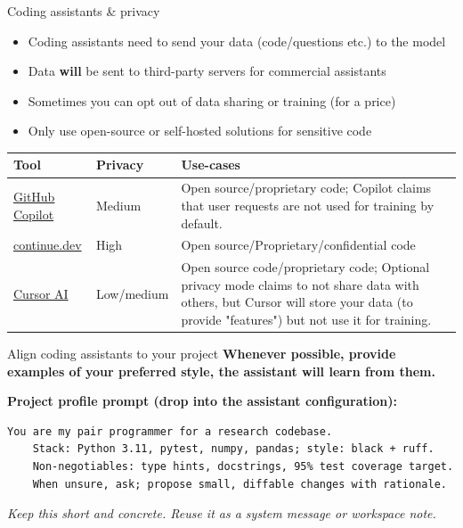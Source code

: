 \documentclass[
  aspectratio=1610,
]{beamer}
\begin{document}
\begin{frame}{Coding assistants \& privacy}
  \begin{itemize}
    \item Coding assistants need to send your data (code/questions etc.) to the model
    \item Data \textbf{will} be sent to third-party servers for commercial assistants
    \item Sometimes you can opt out of data sharing or training (for a price)
    \item Only use open-source or self-hosted solutions for sensitive code
  \end{itemize}
  \vspace{0.5em}
  \begin{tabularx}{\linewidth}{@{} l l X @{}}
    \toprule
    \textbf{Tool}                                              & \textbf{Privacy} & \textbf{Use-cases}                                                                                                                                                                  \\
    \midrule
    \href{https://github.com/features/copilot}{GitHub Copilot} & Medium           & Open source/proprietary code; Copilot claims that user requests are not used for training by default.                                                                               \\
    \href{https://continue.dev}{continue.dev}                  & High             & Open source/Proprietary/confidential code                                                                                                                                           \\
    \href{https://cursor.com}{Cursor AI}                       & Low/medium       & Open source code/proprietary code; Optional privacy mode claims to not share data with others, but Cursor will store your data (to provide "features") but not use it for training. \\
    \bottomrule
  \end{tabularx}
\end{frame}


\begin{frame}[fragile]{Align coding assistants to your project}
  \textbf{Whenever possible, provide examples of your preferred style, the assistant will learn from them.}

  \vspace{0.5em}

  \textbf{Project profile prompt (drop into the assistant configuration):}
  \begin{lstlisting}[style=code]
    You are my pair programmer for a research codebase.
    Stack: Python 3.11, pytest, numpy, pandas; style: black + ruff.
    Non-negotiables: type hints, docstrings, 95% test coverage target.
    When unsure, ask; propose small, diffable changes with rationale.
  \end{lstlisting}
  \vspace{0.3em}
  \textit{Keep this short and concrete. Reuse it as a system message or workspace note.}
\end{frame}
\end{document}
